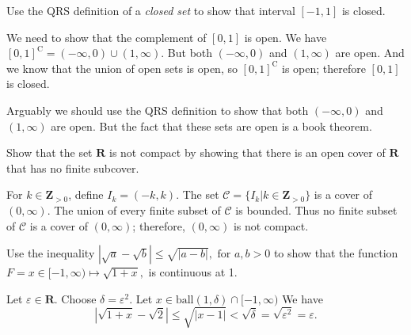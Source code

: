 \documentclass[12pt,fleqn]{exam}
\newcommand{\reals}{\mathbf{R}}
\newcommand{\ball}{\mathrm{ball}}
\newcommand{\integers}{\mathbf{Z}}
\begin{document}
\begin{questions}
\newpage

\question  [10] Use the QRS definition of a \emph{closed set} to show that interval \([-1,1]\) is closed.

\begin{solution} We need to show that the complement of  \([0,1]\) is open. We have
$ [0,1]^{\mathrm{C}} = (-\infty,0) \cup (1,\infty)$.  But both  $(-\infty,0)$  and $(1,\infty)$ are open. And we know that the union of
open sets is open, so  $[0,1]^{\mathrm{C}}$ is open; therefore \([0,1]\) is closed.

\quad Arguably we should use the QRS definition to show that both  $(-\infty,0)$  and $(1,\infty)$ are open. But the fact that these sets are
open is a book theorem.

\end{solution}

\newpage


 







\question   [10] Show that the set \(\reals \) is not compact by 
showing that there is an open cover of \(\reals \) that has no
finite subcover.

\begin{solution}
 For \(k \in \integers_{>0}\), define \(I_k = (-k,k)\).
The set \(\mathcal{C} = \{I_k | k \in \integers_{>0}\}\) is a cover of 
\((0,\infty)\).  The union of every finite subset of \(\mathcal{C}\)
is bounded. Thus no finite subset of \(\mathcal{C}\) is a cover of
\((0,\infty)\); therefore, \((0,\infty)\) is not compact.
\end{solution}

\newpage









\question  [10]  Use the inequality
\(
   | \sqrt{a} - \sqrt{b} | \leq \sqrt{|a -b|},\mbox{ for } a,b > 0
\)
to show that the function
\(
   F = x \in [-1,\infty) \mapsto  \sqrt{1+x},
\)
is continuous at 1.

\begin{solution} Let $\varepsilon \in \reals$. Choose $\delta  = \varepsilon^2$. Let $x \in \ball(1,\delta) \cap [-1,\infty)$ We have
\[
   | \sqrt{1+x} - \sqrt{2} | \leq \sqrt{|x-1|} < \sqrt{\delta} = \sqrt{\varepsilon^2} = \varepsilon.
\]

\end{solution}
\end{questions}
\end{document}
